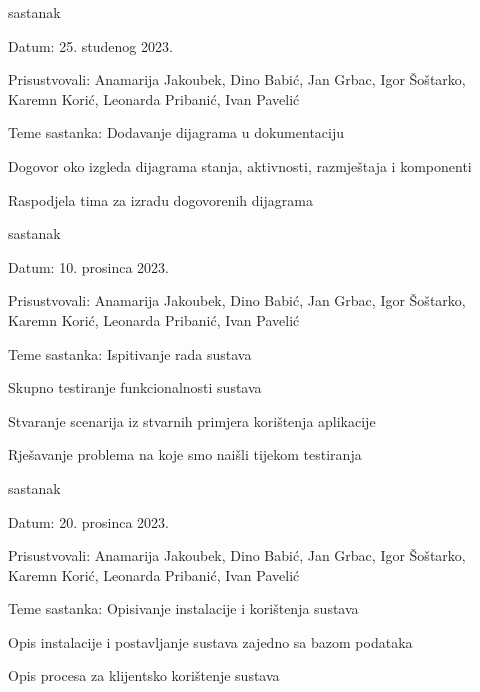\begin{packed_enum}
			\item  sastanak
			\item[] \begin{packed_item}
				\item Datum: 25. studenog 2023.
				\item Prisustvovali: Anamarija Jakoubek, Dino Babić, Jan Grbac, Igor Šoštarko, Karemn Korić, Leonarda Pribanić, Ivan Pavelić
				\item Teme sastanka: Dodavanje dijagrama u dokumentaciju
				\begin{packed_item}
					\item Dogovor oko izgleda dijagrama stanja, aktivnosti, razmještaja i komponenti
					\item Raspodjela tima za izradu dogovorenih dijagrama
				\end{packed_item}
			\end{packed_item}
			
			\item  sastanak
			\item[] \begin{packed_item}
				\item Datum: 10. prosinca 2023.
				\item Prisustvovali: Anamarija Jakoubek, Dino Babić, Jan Grbac, Igor Šoštarko, Karemn Korić, Leonarda Pribanić, Ivan Pavelić
				\item Teme sastanka: Ispitivanje rada sustava
				\begin{packed_item}
					\item Skupno testiranje funkcionalnosti sustava
					\item Stvaranje scenarija iz stvarnih primjera korištenja aplikacije
					\item Rješavanje problema na koje smo naišli tijekom testiranja
				\end{packed_item}
			\end{packed_item}
			
			\item  sastanak
			\item[] \begin{packed_item}
				\item Datum: 20. prosinca 2023.
				\item Prisustvovali: Anamarija Jakoubek, Dino Babić, Jan Grbac, Igor Šoštarko, Karemn Korić, Leonarda Pribanić, Ivan Pavelić
				\item Teme sastanka: Opisivanje instalacije i korištenja sustava
				\begin{packed_item}
					\item Opis instalacije i postavljanje sustava zajedno sa bazom podataka
					\item Opis procesa za klijentsko korištenje sustava
				\end{packed_item}
			\end{packed_item}
			

\end{packed_enum}
